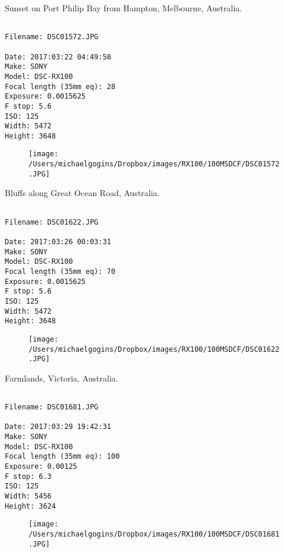 \documentclass[11pt,letter,DIV=14,paper=landscape]{scrbook}
\begin{document}
\clearpage
\noindent Sunset on Port Philip Bay from Hampton, Melbourne, Australia.
\noindent
\begin{lstlisting}

Filename: DSC01572.JPG

Date: 2017:03:22 04:49:58
Make: SONY
Model: DSC-RX100
Focal length (35mm eq): 28
Exposure: 0.0015625
F stop: 5.6
ISO: 125
Width: 5472
Height: 3648
\end{lstlisting}
\clearpage

\begin{figure}
\texttt{[image: /Users/michaelgogins/Dropbox/images/RX100/100MSDCF/DSC01572.JPG]}
\end{figure}
    
\clearpage
\noindent Bluffs along Great Ocean Road, Australia.
\noindent
\begin{lstlisting}

Filename: DSC01622.JPG

Date: 2017:03:26 00:03:31
Make: SONY
Model: DSC-RX100
Focal length (35mm eq): 70
Exposure: 0.0015625
F stop: 5.6
ISO: 125
Width: 5472
Height: 3648
\end{lstlisting}
\clearpage

\begin{figure}
\texttt{[image: /Users/michaelgogins/Dropbox/images/RX100/100MSDCF/DSC01622.JPG]}
\end{figure}
    
\clearpage
\noindent Farmlands, Victoria, Australia.
\noindent
\begin{lstlisting}

Filename: DSC01681.JPG

Date: 2017:03:29 19:42:31
Make: SONY
Model: DSC-RX100
Focal length (35mm eq): 100
Exposure: 0.00125
F stop: 6.3
ISO: 125
Width: 5456
Height: 3624
\end{lstlisting}
\clearpage

\begin{figure}
\texttt{[image: /Users/michaelgogins/Dropbox/images/RX100/100MSDCF/DSC01681.JPG]}
\end{figure}
    
\end{document}

